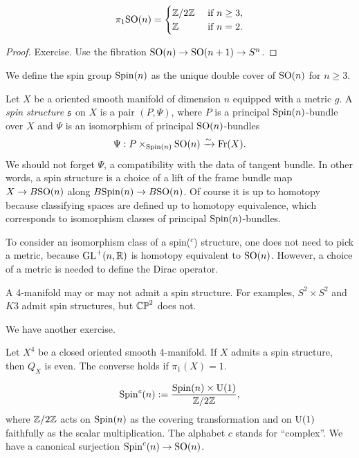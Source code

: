 \documentclass{../../../small}
\begin{document}
\begin{lemma}
\[\pi_1\mathrm{SO}(n)=\begin{cases}
\mathbb{Z}/2\mathbb{Z}&\text{ if }n\ge3,\\
\mathbb{Z}&\text{ if }n=2.
\end{cases}\]
\end{lemma}
\begin{proof}
Exercise.
Use the fibration $\mathrm{SO}(n)\to\mathrm{SO}(n+1)\to S^n$.
\end{proof}

We define the spin group $\mathrm{Spin}(n)$ as the unique double cover of $\mathrm{SO}(n)$ for $n\ge3$.

\begin{definition}
Let $X$ be a oriented smooth manifold of dimension $n$ equipped with a metric $g$.
A \emph{spin structure} $\mathfrak{s}$ on $X$ is a pair $(P,\Psi)$, where $P$ is a principal $\mathrm{Spin}(n)$-bundle over $X$ and $\Psi$ is an isomorphism of principal $\mathrm{SO}(n)$-bundles
\[\Psi:P\times_{\mathrm{Spin}(n)}\mathrm{SO}(n)\xrightarrow{\sim}\mathrm{Fr}(X).\]
We should not forget $\Psi$, a compatibility with the data of tangent bundle.
In other words, a spin structure is a choice of a lift of the frame bundle map $X\to B\mathrm{SO}(n)$ along $B\mathrm{Spin}(n)\to B\mathrm{SO}(n)$. Of course it is up to homotopy because classifying spaces are defined up to homotopy equivalence, which corresponds to isomorphism classes of principal $\mathrm{Spin}(n)$-bundles.
\end{definition}

\begin{remark}
To consider an isomorphism class of a spin($^c$) structure, one does not need to pick a metric, because $\mathrm{GL}^+(n,\mathbb{R})$ is homotopy equivalent to $\mathrm{SO}(n)$.
However, a choice of a metric is needed to define the Dirac operator. 
\end{remark}

\begin{remark}
A 4-manifold may or may not admit a spin structure.
For examples, $S^2\times S^2$ and $K3$ admit spin structures, but $\mathbb{CP}^2$ does not.
\end{remark}

We have another exercise.
\begin{lemma}
Let $X^4$ be a closed oriented smooth 4-manifold.
If $X$ admits a spin structure, then $Q_X$ is even.
The converse holds if $\pi_1(X)=1$.
\end{lemma}


\begin{definition}
\[\mathrm{Spin}^c(n):=\frac{\mathrm{Spin}(n)\times\mathrm{U}(1)}{\mathbb{Z}/2\mathbb{Z}},\]
where $\mathbb{Z}/2\mathbb{Z}$ acts on $\mathrm{Spin}(n)$ as the covering transformation and on $\mathrm{U}(1)$ faithfully as the scalar multiplication.
The alphabet $c$ stands for ``complex''.
We have a canonical surjection $\mathrm{Spin}^c(n)\to\mathrm{SO}(n)$.
\end{definition}
\end{document}
